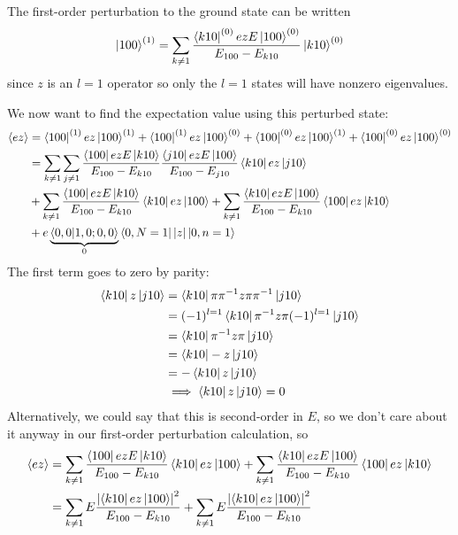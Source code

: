 \documentclass[a4paper,twoside]{article}
\begin{document}
\begin{problem}
    The first-order perturbation to the ground state can be written
    \begin{equation}
        \ket{100}^{(1)} = \sum_{k \neq 1} \frac{\bra{k10}^{(0)}ezE\ket{100}^{(0)}}{E_{100} - E_{k10}}\ket{k10}^{(0)}
    \end{equation}
    since $ z $ is an $ l=1 $ operator so only the $ l=1 $ states will have nonzero eigenvalues.

    We now want to find the expectation value using this perturbed state:
    \begin{align}
        \ev{ez} &= \bra{100}^{(1)} ez\ket{100}^{(1)} +\bra{100}^{(1)} ez\ket{100}^{(0)} +\bra{100}^{(0)} ez\ket{100}^{(1)} +\bra{100}^{(0)} ez\ket{100}^{(0)} \\
        &= \sum_{k \neq 1} \sum_{j \neq 1} \frac{\bra{100} ezE\ket{k10}}{E_{100} - E_{k10}} \frac{\bra{j10} ezE\ket{100}}{E_{100} - E_{j10}}\bra{k10}ez\ket{j10} \\
        &+ \sum_{k \neq 1} \frac{\bra{100} ezE\ket{k10}}{E_{100} - E_{k10}} \bra{k10} ez\ket{100} + \sum_{k \neq 1} \frac{\bra{k10} ezE\ket{100}}{E_{100} - E_{k10}} \bra{100} ez\ket{k10} \\
        &+ e\underbrace{\bra{0,0}\ket{1,0;0,0}}_{0}\bra{0,N=1}|z|\ket{0,n=1} 
    \end{align}
    The first term goes to zero by parity:
    \begin{align}
        \bra{k10} z\ket{j10} &= \bra{k10} \pi \pi^{-1} z \pi \pi^{-1}\ket{j10} \\
        &= (-1)^{l=1}\bra{k10} \pi^{-1} z \pi (-1)^{l=1}\ket{j10} \\
        &=\bra{k10} \pi^{-1} z \pi\ket{j10} \\
        &=\bra{k10} -z\ket{j10} \\
        &= -\bra{k10} z\ket{j10} \\
        &\implies\bra{k10} z\ket{j10} = 0
    \end{align}
    Alternatively, we could say that this is second-order in $ E $, so we don't care about it anyway in our first-order perturbation calculation, so
    \begin{align}
        \ev{ez} &= \sum_{k \neq 1} \frac{\bra{100} ezE\ket{k10}}{E_{100} - E_{k10}} \bra{k10} ez\ket{100} + \sum_{k \neq 1} \frac{\bra{k10} ezE\ket{100}}{E_{100} - E_{k10}} \bra{100} ez\ket{k10} \\
        &= \sum_{k \neq 1} E\frac{\abs{\bra{k10} ez\ket{100}}^2}{E_{100} - E_{k10}} + \sum_{k \neq 1} E\frac{\abs{\bra{k10} ez\ket{100}}^2}{E_{100} - E_{k10}} \\

\end{align}
\end{problem}
\end{document}

